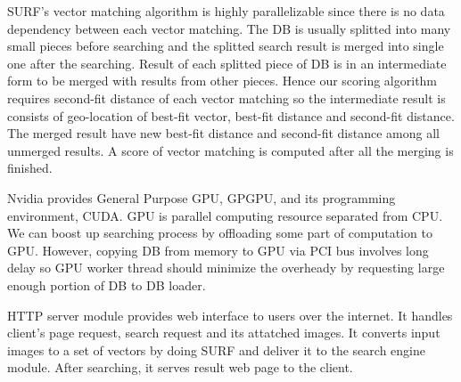 %

SURF's vector matching algorithm is highly parallelizable since there is no data dependency between each vector matching.
The DB is usually splitted into many small pieces before searching and the splitted search result is merged into single one after the searching.
Result of each splitted piece of DB is in an intermediate form to be merged with results from other pieces.
Hence our scoring algorithm requires second-fit distance of each vector matching so the intermediate result is consists of geo-location of best-fit vector, best-fit distance and second-fit distance.
The merged result have new best-fit distance and second-fit distance among all unmerged results.
A score of vector matching is computed after all the merging is finished.

Nvidia provides General Purpose GPU, GPGPU, and its programming environment, CUDA.
GPU is parallel computing resource separated from CPU.
We can boost up searching process by offloading some part of computation to GPU.
However, copying DB from memory to GPU via PCI bus involves long delay so GPU worker thread should minimize the overheady by requesting large enough portion of DB to DB loader.

HTTP server module provides web interface to users over the internet.
It handles client's page request, search request and its attatched images.
It converts input images to a set of vectors by doing SURF and deliver it to the search engine module.
After searching, it serves result web page to the client.

